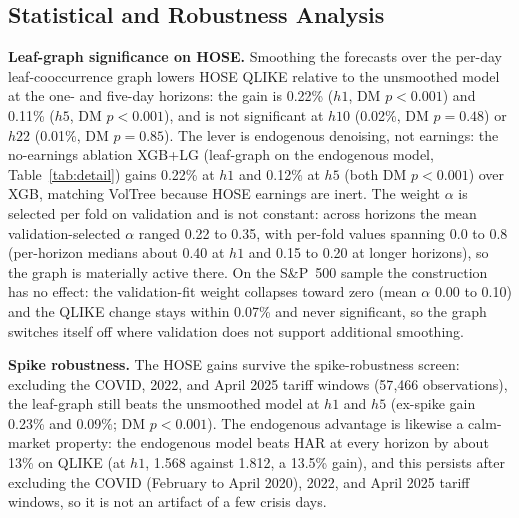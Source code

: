 \documentclass[runningheads,a4paper]{llncs}
\begin{document}
\subsection{Statistical and Robustness Analysis}\label{sec:robust}
\textbf{Leaf-graph significance on HOSE.} Smoothing the forecasts over the per-day leaf-cooccurrence graph
lowers HOSE QLIKE relative to the unsmoothed model at the one- and five-day
horizons: the gain is 0.22\% ($h1$, DM $p<0.001$) and 0.11\% ($h5$, DM $p<0.001$), and is not
significant at $h10$ (0.02\%, DM $p=0.48$) or $h22$ (0.01\%, DM $p=0.85$).
The lever is endogenous denoising, not earnings: the no-earnings ablation XGB+LG (leaf-graph on the
endogenous model, Table~\ref{tab:detail}) gains 0.22\% at $h1$ and 0.12\% at $h5$ (both DM $p<0.001$) over
XGB, matching VolTree because HOSE earnings are inert.
The weight $\alpha$ is selected per fold on validation and is not constant: across horizons the mean
validation-selected $\alpha$ ranged 0.22 to 0.35, with per-fold values spanning 0.0 to 0.8 (per-horizon
medians about 0.40 at $h1$ and 0.15 to 0.20 at longer horizons), so the graph is materially active there.
On the S\&P~500 sample the construction
has no effect: the validation-fit weight collapses toward zero (mean $\alpha$ 0.00 to 0.10) and the QLIKE
change stays within 0.07\% and never significant, so the graph switches itself off where validation does
not support additional smoothing.

\textbf{Spike robustness.} The HOSE gains survive the spike-robustness screen: excluding the COVID, 2022,
and April 2025 tariff windows (57{,}466 observations), the leaf-graph still beats the unsmoothed model at
$h1$ and $h5$ (ex-spike gain 0.23\% and 0.09\%; DM $p<0.001$).
The endogenous advantage is likewise a calm-market property: the endogenous model beats HAR at every
horizon by about 13\% on QLIKE (at $h1$, 1.568 against 1.812, a 13.5\% gain), and this persists after
excluding the COVID (February to April 2020), 2022, and April 2025 tariff windows, so it is not an
artifact of a few crisis days.
\end{document}
